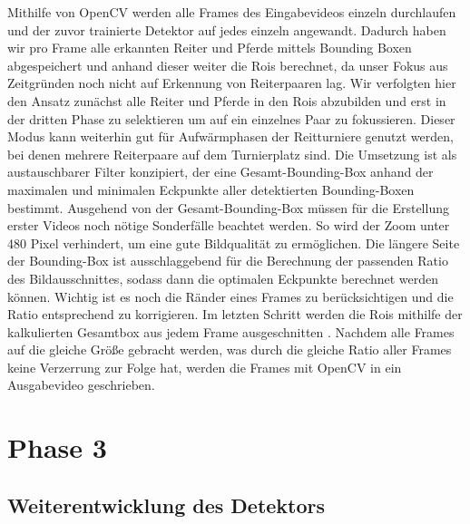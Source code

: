 Mithilfe von OpenCV werden alle Frames des Eingabevideos einzeln durchlaufen und der zuvor trainierte Detektor auf jedes einzeln angewandt. Dadurch haben wir pro Frame alle erkannten Reiter und Pferde mittels Bounding Boxen abgespeichert und anhand dieser weiter die Rois berechnet, da unser Fokus aus Zeitgründen noch nicht auf Erkennung von Reiterpaaren lag. Wir verfolgten hier den Ansatz zunächst alle Reiter und Pferde in den Rois abzubilden und erst in der dritten Phase zu selektieren um auf ein einzelnes Paar zu fokussieren. Dieser Modus kann weiterhin gut für Aufwärmphasen der Reitturniere genutzt werden, bei denen mehrere Reiterpaare auf dem Turnierplatz sind. Die Umsetzung ist als austauschbarer Filter konzipiert, der eine Gesamt-Bounding-Box anhand der maximalen und minimalen Eckpunkte aller detektierten Bounding-Boxen bestimmt.
Ausgehend von der Gesamt-Bounding-Box müssen für die Erstellung erster Videos noch nötige Sonderfälle beachtet werden. So wird der Zoom unter 480 Pixel verhindert, um eine gute Bildqualität zu ermöglichen. Die längere Seite der Bounding-Box ist ausschlaggebend für die Berechnung der passenden Ratio des Bildausschnittes, sodass dann die optimalen  Eckpunkte berechnet werden können. Wichtig ist es noch die Ränder eines Frames zu berücksichtigen und die Ratio entsprechend zu korrigieren.
Im letzten Schritt werden die Rois mithilfe der kalkulierten Gesamtbox aus jedem Frame ausgeschnitten  . Nachdem alle Frames auf die gleiche Größe gebracht werden, was durch die gleiche Ratio aller Frames keine Verzerrung zur Folge hat, werden die Frames mit OpenCV in ein Ausgabevideo geschrieben.





\section{Phase 3}
\subsection*{Weiterentwicklung des Detektors}

